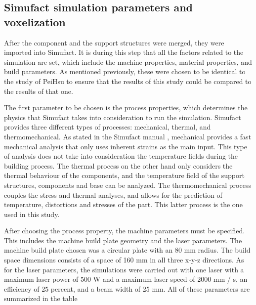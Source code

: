 \documentclass{article}
\begin{document}

\subsection{Simufact simulation parameters and voxelization}


After the component and the support structures were merged, they were imported into Simufact. It is during this step that all the factors related to the simulation are set, which include the machine properties, material properties, and build parameters. As mentioned previously, these were chosen to be identical to the study of PeiHsu to ensure that the results of this study could be compared to the results of that one. 

The first parameter to be chosen is the process properties, which determines the physics that Simufact takes into consideration to run the simulation. Simufact provides three different types of processes: mechanical, thermal, and thermomechanical. As stated in the Simufact manual , mechanical provides a fast mechanical analysis that only uses inherent strains as the main input. This type of analysis does not take into consideration the temperature fields during the building process. The thermal process on the other hand only considers the thermal behaviour of the components, and the temperature field of the support structures, components and base can be analyzed. The thermomechanical process couples the stress and thermal analyses, and allows for the prediction of temperature, distortions and stresses of the part. This latter process is the one used in this study.

After choosing the process property, the machine parameters must be specified. This includes the machine build plate geometry and the laser parameters. The machine build plate chosen was a circular plate with an 80 mm radius. The build space dimensions consists of a space of 160 mm in all three x-y-z directions. As for the laser parameters, the simulations were carried out with one laser with a maximum laser power of 500 W and a maximum laser speed of 2000 mm / s, an efficiency of 25 percent, and a beam width of 25 mm. All of these parameters are summarized in the table 
\end{document}
